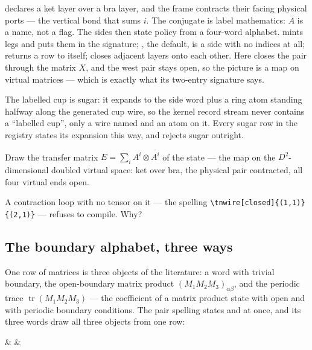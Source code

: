  declares a ket layer over a bra layer, and the frame
contracts their facing physical ports --- the vertical bond that sums $i$.
The conjugate is label mathematics: $\overline{A}$ is a name, not a flag.
The sides then state policy from a four-word alphabet.   mints
legs and puts them in the signature; , the default, is a side
with no indices at all;  returns a row to itself; 
closes adjacent layers onto each other.  Here 
closes the pair through the matrix $X$, and the west pair stays open, so
the picture is a map on virtual matrices --- which is exactly what its
two-entry signature says.

\dbendpar The labelled cup is sugar: it expands to the side word
 plus a ring atom standing halfway along the generated cup
wire, so the kernel record stream never contains a ``labelled cup'',
only a wire named  and an atom on it.  Every sugar row in
the registry states its expansion this way, and 
rejects sugar outright.

 Draw the transfer matrix
$E=\sum_i A^i\otimes\overline{A^i}$ of the state --- the map on the
$D^2$-dimensional doubled virtual space: ket over bra, the physical pair
contracted, all four virtual ends open.

 A contraction loop with no tensor on it ---
the spelling \verb|\tnwire[closed]{(1,1)}{(2,1)}| --- refuses to
compile.  Why?

\subsection{The boundary alphabet, three ways}

One row of matrices is three objects of the literature: a word with
trivial boundary, the open-boundary matrix product
$(M_1M_2M_3)_{\alpha\beta}$, and the periodic trace
$\operatorname{tr}(M_1M_2M_3)$ --- the coefficient of a matrix product
state with open and with periodic boundary conditions.  The pair
spelling  states  and  at
once, and its three words draw all three objects from one row:

\begin{tnmultiples}[
  formula={(M_1M_2M_3)_{\alpha\beta}},
  caption={one row, three boundary conditions},
  index={Left to right: the outer bonds close trivially and nothing is
    exposed; both ends open and the row is a matrix; the trace returns the
    row to itself and the picture is a scalar.  The quoted signature is the
    open panel's; the other two are empty.},
  signature={kernel-boundary|signature=open:e, open:w},
  variants={{boundary=none}{boundary=none},
            {boundary=open}{boundary=open},
            {boundary=periodic}{boundary=periodic}}]
\begin{tenkz}[rows={wire}, cols=3, variant]
   &  & 
\end{tenkz}
\end{tnmultiples}

